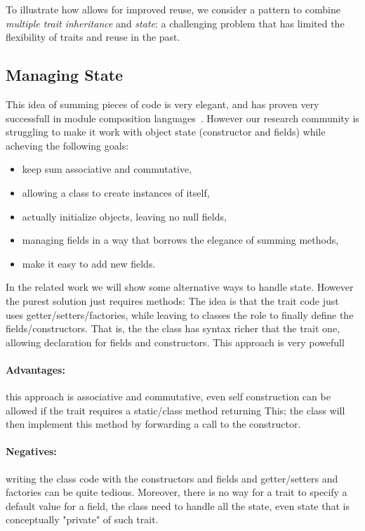 To illustrate how \name allows for improved reuse, we consider a
pattern to combine \emph{multiple trait inheritance} and \emph{state}:
a challenging problem that has limited the flexibility of traits and
reuse in the past.

\subsection{Managing State}

This idea of summing pieces of code is very elegant, and has proven
very successfull in module composition
languages~\cite{ancona2002calculus}. 
However our research community is
struggling to make it work with object state (constructor and fields)
while acheving the following goals:

\begin{itemize}
\item keep sum associative and commutative,
\item allowing a class to create instances of itself,
\item actually initialize objects, leaving no null fields,
\item managing fields in a way that borrows the elegance of summing methods,
\item make it easy to add new fields.
\end{itemize}

In the related work we will show some alternative ways to handle state.
However the purest solution just requires methods:
  The idea is that
  the trait code just uses getter/setters/factories, while leaving
  to classes the role to finally define the fields/constructors.
  That is, the  the class has syntax richer that the trait one,
  allowing declaration for fields and constructors.
  This approach is very powefull~\cite{wang2016classless}
 
\paragraph*{Advantages:} 
this approach is associative and commutative, even self construction
  can be allowed if the trait requires a static/class method
  returning This; the class will then implement this method by forwarding
  a call to the constructor.
  
\paragraph*{Negatives:} writing the class code with the constructors and
   fields and getter/setters and factories can be quite tedious.
   Moreover, there is no way for a trait to specify a default value for a field,
   the class need to handle all the state, even state that is conceptually
   "private" of such trait.

